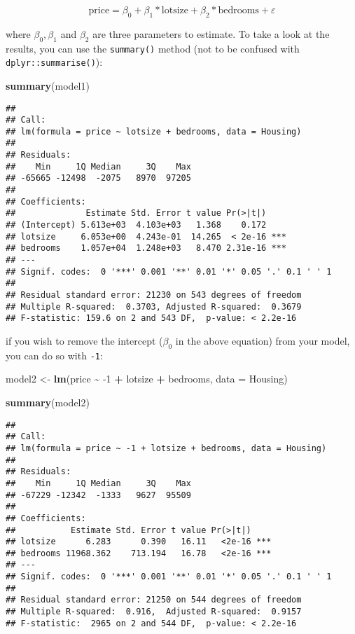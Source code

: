 \documentclass[
]{article}
\newenvironment{Shaded}{\begin{snugshade}}{\end{snugshade}}
\newcommand{\DataTypeTok}[1]{\textcolor[rgb]{0.13,0.29,0.53}{#1}}
\newcommand{\DecValTok}[1]{\textcolor[rgb]{0.00,0.00,0.81}{#1}}
\newcommand{\KeywordTok}[1]{\textcolor[rgb]{0.13,0.29,0.53}{\textbf{#1}}}
\newcommand{\NormalTok}[1]{#1}
\newcommand{\OperatorTok}[1]{\textcolor[rgb]{0.81,0.36,0.00}{\textbf{#1}}}
\newcommand{\StringTok}[1]{\textcolor[rgb]{0.31,0.60,0.02}{#1}}
\begin{document}
\[
\text{price} = \beta_0 + \beta_1 * \text{lotsize} + \beta_2 * \text{bedrooms} + \varepsilon
\]

where \(\beta_0, \beta_1\) and \(\beta_2\) are three parameters to estimate. To take a look at the
results, you can use the \texttt{summary()} method (not to be confused with \texttt{dplyr::summarise()}):

\begin{Shaded}
\begin{Highlighting}[]
\KeywordTok{summary}\NormalTok{(model1)}
\end{Highlighting}
\end{Shaded}

\begin{verbatim}
## 
## Call:
## lm(formula = price ~ lotsize + bedrooms, data = Housing)
## 
## Residuals:
##    Min     1Q Median     3Q    Max 
## -65665 -12498  -2075   8970  97205 
## 
## Coefficients:
##              Estimate Std. Error t value Pr(>|t|)    
## (Intercept) 5.613e+03  4.103e+03   1.368    0.172    
## lotsize     6.053e+00  4.243e-01  14.265  < 2e-16 ***
## bedrooms    1.057e+04  1.248e+03   8.470 2.31e-16 ***
## ---
## Signif. codes:  0 '***' 0.001 '**' 0.01 '*' 0.05 '.' 0.1 ' ' 1
## 
## Residual standard error: 21230 on 543 degrees of freedom
## Multiple R-squared:  0.3703, Adjusted R-squared:  0.3679 
## F-statistic: 159.6 on 2 and 543 DF,  p-value: < 2.2e-16
\end{verbatim}

if you wish to remove the intercept (\(\beta_0\) in the above equation) from your model, you can
do so with \texttt{-1}:

\begin{Shaded}
\begin{Highlighting}[]
\NormalTok{model2 \textless{}{-}}\StringTok{ }\KeywordTok{lm}\NormalTok{(price }\OperatorTok{\textasciitilde{}}\StringTok{ }\DecValTok{{-}1} \OperatorTok{+}\StringTok{ }\NormalTok{lotsize }\OperatorTok{+}\StringTok{ }\NormalTok{bedrooms, }\DataTypeTok{data =}\NormalTok{ Housing)}

\KeywordTok{summary}\NormalTok{(model2)}
\end{Highlighting}
\end{Shaded}

\begin{verbatim}
## 
## Call:
## lm(formula = price ~ -1 + lotsize + bedrooms, data = Housing)
## 
## Residuals:
##    Min     1Q Median     3Q    Max 
## -67229 -12342  -1333   9627  95509 
## 
## Coefficients:
##           Estimate Std. Error t value Pr(>|t|)    
## lotsize      6.283      0.390   16.11   <2e-16 ***
## bedrooms 11968.362    713.194   16.78   <2e-16 ***
## ---
## Signif. codes:  0 '***' 0.001 '**' 0.01 '*' 0.05 '.' 0.1 ' ' 1
## 
## Residual standard error: 21250 on 544 degrees of freedom
## Multiple R-squared:  0.916,  Adjusted R-squared:  0.9157 
## F-statistic:  2965 on 2 and 544 DF,  p-value: < 2.2e-16
\end{verbatim}
\end{document}

